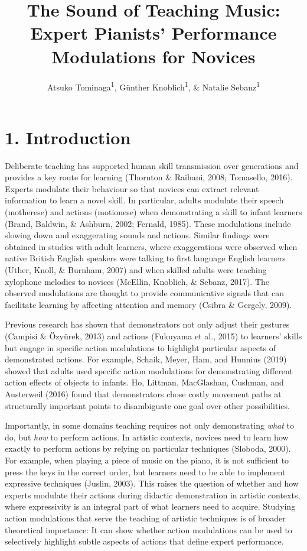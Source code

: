 \documentclass[
  english,
  man,floatsintext]{apa6}
\author{Atsuko Tominaga\textsuperscript{1}, Günther Knoblich\textsuperscript{1}, \& Natalie Sebanz\textsuperscript{1}}
\affiliation{
\vspace{0.5cm}
\textsuperscript{1} Department of Cognitive Science, Central European University}
\title{The Sound of Teaching Music: Expert Pianists' Performance Modulations for Novices}
\date{}
\begin{document}
\maketitle

\hypertarget{introduction}{%
\section{1. Introduction}\label{introduction}}

Deliberate teaching has supported human skill transmission over generations and provides a key route for learning (Thornton \& Raihani, 2008; Tomasello, 2016). Experts modulate their behaviour so that novices can extract relevant information to learn a novel skill. In particular, adults modulate their speech (motherese) and actions (motionese) when demonstrating a skill to infant learners (Brand, Baldwin, \& Ashburn, 2002; Fernald, 1985). These modulations include slowing down and exaggerating sounds and actions. Similar findings were obtained in studies with adult learners, where exaggerations were observed when native British English speakers were talking to first language English learners (Uther, Knoll, \& Burnham, 2007) and when skilled adults were teaching xylophone melodies to novices (McEllin, Knoblich, \& Sebanz, 2017). The observed modulations are thought to provide communicative signals that can facilitate learning by affecting attention and memory (Csibra \& Gergely, 2009).

Previous research has shown that demonstrators not only adjust their gestures (Campisi \& Özyürek, 2013) and actions (Fukuyama et al., 2015) to learners' skills but engage in specific action modulations to highlight particular aspects of demonstrated actions. For example, Schaik, Meyer, Ham, and Hunnius (2019) showed that adults used specific action modulations for demonstrating different action effects of objects to infants. Ho, Littman, MacGlashan, Cushman, and Austerweil (2016) found that demonstrators chose costly movement paths at structurally important points to disambiguate one goal over other possibilities.

Importantly, in some domains teaching requires not only demonstrating \emph{what} to do, but \emph{how} to perform actions. In artistic contexts, novices need to learn how exactly to perform actions by relying on particular techniques (Sloboda, 2000). For example, when playing a piece of music on the piano, it is not sufficient to press the keys in the correct order, but learners need to be able to implement expressive techniques (Juslin, 2003). This raises the question of whether and how experts modulate their actions during didactic demonstration in artistic contexts, where expressivity is an integral part of what learners need to acquire. Studying action modulations that serve the teaching of artistic techniques is of broader theoretical importance: It can show whether action modulations can be used to selectively highlight subtle aspects of actions that define expert performance.
\end{document}

